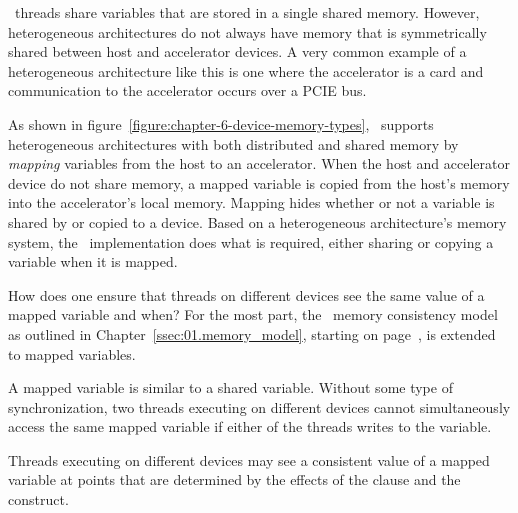 \OMP\ threads 
share variables that are stored in a single shared memory.  However, 
heterogeneous architectures do not always have memory that is symmetrically shared between
host and accelerator devices.  A very common example of a 
heterogeneous architecture like this is one where the accelerator is a card 
and communication to the accelerator occurs over a PCIE bus. 

As shown in figure~\ref{figure:chapter-6-device-memory-types}, \OMP\ supports
heterogeneous architectures with both distributed and shared memory by \emph{mapping}
variables from the host to an accelerator.
When the host and accelerator device do not share memory, a mapped variable
is copied from the host's memory into the accelerator's local memory.
Mapping hides whether or not a variable is shared by or copied to a device.
Based on a heterogeneous architecture's memory system, the \OMP\
implementation does what is required, either sharing or copying a variable when it
is mapped.

\begin{figure*}[!tbhp]
\centering
{}
\caption{ \textbf{A mapped variable in shared or distributed memory} -- \small
        A mapped variable may be in either shared or distributed memory.
        The OpenMP implementation determines if copies are required.
        }
\label{figure:chapter-6-device-memory-types}
\end{figure*}

How does one ensure that threads on different devices see the same
value of a mapped variable and when?  For the most part, the \OMP\ memory
consistency model as outlined in Chapter~\ref{ssec:01.memory_model}, starting on
page~\pageref{ssec:01.memory_model}, is extended to mapped variables.  

A mapped variable is similar to a shared variable.  Without some 
type of synchronization, two threads executing on
different devices cannot simultaneously access the same mapped variable if
either of the threads writes to the variable.  

Threads executing on different devices may see a consistent value of a mapped
variable at points that are determined by the effects of the \code{map} clause
and the \code{target update} construct.

